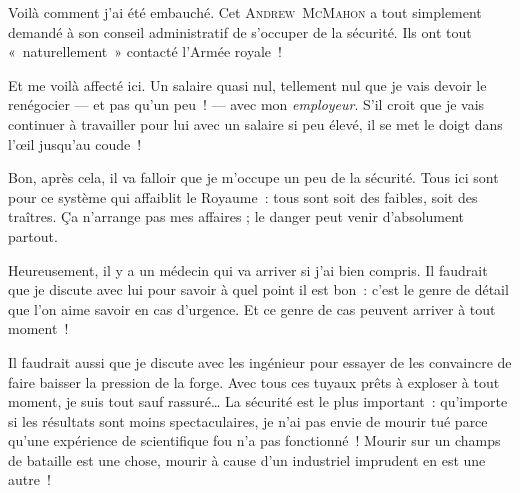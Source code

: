 {{Voilà comment j’ai été embauché.
Cet \textsc{Andrew~McMahon} a tout simplement demandé à son conseil administratif de s’occuper de la sécurité.
Ils ont tout «~naturellement~» contacté l’Armée royale~!

Et me voilà affecté ici.
Un salaire quasi nul, tellement nul que je vais devoir le renégocier — et pas qu’un peu~! — avec mon \emph{employeur}.
S’il croit que je vais continuer à travailler pour lui avec un salaire si peu élevé, il se met le doigt dans l’œil jusqu’au coude~!

Bon, après cela, il va falloir que je m’occupe un peu de la sécurité.
Tous ici sont pour ce système qui affaiblit le Royaume~:  tous sont soit des faibles, soit des traîtres.
Ça n’arrange pas mes affaires ; le danger peut venir d’absolument partout.

Heureusement, il y a un médecin qui va arriver si j’ai bien compris.
Il faudrait que je discute avec lui pour savoir à quel point il est bon~:  c’est le genre de détail que l’on aime savoir en cas d’urgence.
Et ce genre de cas peuvent arriver à tout moment~!

Il faudrait aussi que je discute avec les ingénieur pour essayer de les convaincre de faire baisser la pression de la forge.
Avec tous ces tuyaux prêts à exploser à tout moment, je suis tout sauf rassuré…
La sécurité est le plus important~:  qu’importe si les résultats sont moins spectaculaires, je n’ai pas envie de mourir tué parce qu’une expérience de scientifique fou n’a pas fonctionné~!
Mourir sur un champs de bataille est une chose, mourir à cause d’un industriel imprudent en est une autre~!
}}

